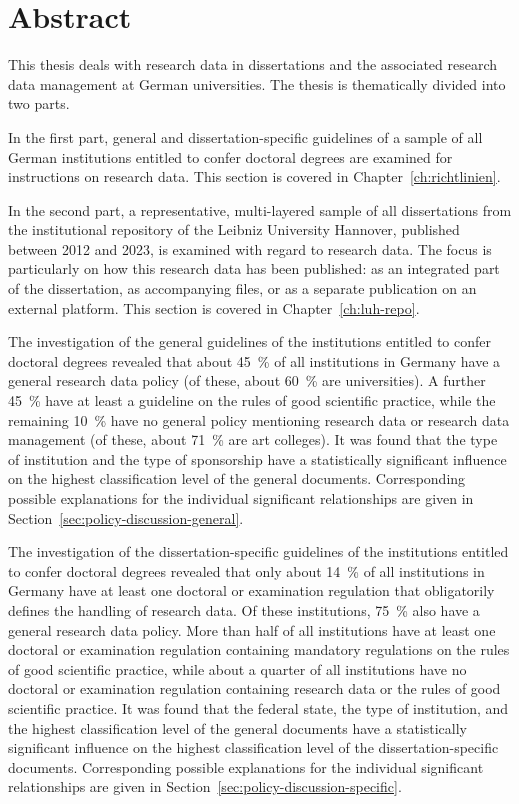 \chapter{Abstract}

This thesis deals with research data in dissertations and the associated research data management at German universities.
The thesis is thematically divided into two parts.

In the first part, general and dissertation-specific guidelines of a sample of all German institutions entitled to confer doctoral degrees are examined for instructions on research data.
This section is covered in Chapter~\ref{ch:richtlinien}.

In the second part, a representative, multi-layered sample of all dissertations from the institutional repository of the Leibniz University Hannover, published between 2012 and 2023, is examined with regard to research data.
The focus is particularly on how this research data has been published: as an integrated part of the dissertation, as accompanying files, or as a separate publication on an external platform.
This section is covered in Chapter~\ref{ch:luh-repo}.

The investigation of the general guidelines of the institutions entitled to confer doctoral degrees revealed that about \SI{45}{\percent} of all institutions in Germany have a general research data policy (of these, about \SI{60}{\percent} are universities).
A further \SI{45}{\percent} have at least a guideline on the rules of good scientific practice, while the remaining \SI{10}{\percent} have no general policy mentioning research data or research data management (of these, about \SI{71}{\percent} are art colleges).
It was found that the type of institution and the type of sponsorship have a statistically significant influence on the highest classification level of the general documents.
Corresponding possible explanations for the individual significant relationships are given in Section~\ref{sec:policy-discussion-general}.

The investigation of the dissertation-specific guidelines of the institutions entitled to confer doctoral degrees revealed that only about \SI{14}{\percent} of all institutions in Germany have at least one doctoral or examination regulation that obligatorily defines the handling of research data.
Of these institutions, \SI{75}{\percent} also have a general research data policy.
More than half of all institutions have at least one doctoral or examination regulation containing mandatory regulations on the rules of good scientific practice, while about a quarter of all institutions have no doctoral or examination regulation containing research data or the rules of good scientific practice.
It was found that the federal state, the type of institution, and the highest classification level of the general documents have a statistically significant influence on the highest classification level of the dissertation-specific documents.
Corresponding possible explanations for the individual significant relationships are given in Section~\ref{sec:policy-discussion-specific}.

